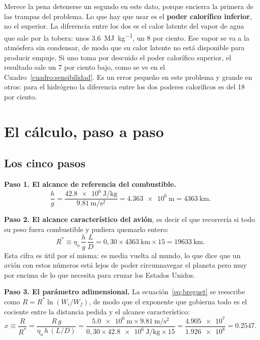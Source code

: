 \documentclass[11pt,letterpaper]{article}
\begin{document}
Merece la pena detenerse un segundo en este dato, porque encierra la primera de
las trampas del problema. Lo que hay que usar es el \textbf{poder calorífico
inferior}, no el superior. La diferencia entre los dos es el calor latente del
vapor de agua que sale por la tobera: unos \SI{3.6}{\mega\joule\per\kilogram},
un 8 por ciento. Ese vapor se va a la atmósfera sin condensar, de modo que su
calor latente no está disponible para producir empuje. Si uno toma por
descuido el poder calorífico superior, el resultado sale un 7 por ciento bajo,
como se ve en el Cuadro~\ref{cuadro:sensibilidad}. Es un error pequeño en este
problema y grande en otros: para el hidrógeno la diferencia entre los dos
poderes caloríficos es del 18 por ciento.

\section{El cálculo, paso a paso}

\subsection{Los cinco pasos}

\textbf{Paso 1. El alcance de referencia del combustible.}
\begin{equation}
\frac{h}{g} = \frac{\SI{42.8e6}{\joule\per\kilogram}}
                   {\SI{9.81}{\meter\per\second\squared}}
            = \SI{4.363e6}{\meter} = \SI{4363}{\kilo\meter}.
\end{equation}

\textbf{Paso 2. El alcance característico del avión}, es decir el que
recorrería si todo su peso fuera combustible y pudiera quemarlo entero:
\begin{equation}
R^{*} \equiv \eta_o\,\frac{h}{g}\,\frac{L}{D}
      = 0{,}30 \times \SI{4363}{\kilo\meter} \times 15
      = \SI{19633}{\kilo\meter}.
\label{eq:rest}
\end{equation}
Esta cifra es útil por sí misma: es media vuelta al mundo, lo que dice que un
avión con estos números está lejos de poder circunnavegar el planeta pero muy
por encima de lo que necesita para cruzar los Estados Unidos.

\textbf{Paso 3. El parámetro adimensional.} La ecuación~\eqref{eq:breguet} se
reescribe como \(R = R^{*}\ln(W_i/W_f)\), de modo que el exponente que gobierna
todo es el cociente entre la distancia pedida y el alcance característico:
\begin{equation}
x \equiv \frac{R}{R^{*}} = \frac{R\,g}{\eta_o\, h\,(L/D)}
  = \frac{\SI{5.0e6}{\meter}\times\SI{9.81}{\meter\per\second\squared}}
         {0{,}30\times\SI{42.8e6}{\joule\per\kilogram}\times 15}
  = \frac{\num{4.905e7}}{\num{1.926e8}} = \num{0.2547}.
\label{eq:x}
\end{equation}
\end{document}

